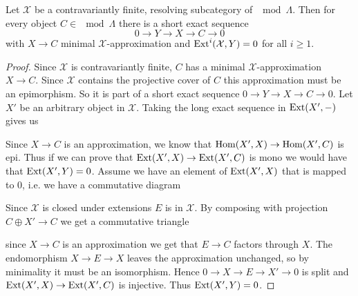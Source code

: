 \begin{lemma} \label{lem:exact_sequence_from_approximation}
	Let $\mathcal X$ be a contravariantly finite, resolving subcategory of $\mod \Lambda$. Then for every object $C \in \mod\Lambda$ there is a short exact sequence 
	$$0 \to Y \to X \to C \to 0$$ 
	with $X\to C$ minimal $\mathcal X$-approximation and $\operatorname{Ext}^i(\mathcal X, Y)=0$ for all $i \geq 1$.
	\begin{proof}
		Since $\mathcal X$ is contravariantly finite, $C$ has a minimal $\mathcal X$-approximation $X \to C$. Since $\mathcal X$ contains the projective cover of $C$ this approximation must be an epimorphism. So it is part of a short exact sequence $0 \to Y \to X \to C \to 0$. Let $X'$ be an arbitrary object in $\mathcal X$. Taking the long exact sequence in $\operatorname{Ext}(X', -)$ gives us
		\begin{center}
		\end{center}
		Since $X \to C$ is an approximation, we know that $\operatorname{Hom}(X', X) \to \operatorname{Hom}(X', C)$ is epi. Thus if we can prove that $\operatorname{Ext}(X', X) \to \operatorname{Ext}(X', C)$ is mono we would have that $\operatorname{Ext}(X', Y)=0$. Assume we have an element of $\operatorname{Ext}(X', X)$ that is mapped to 0, i.e. we have a commutative diagram
		\begin{center}
		\end{center}
		Since $\mathcal X$ is closed under extensions $E$ is in $\mathcal X$. By composing with projection $C\oplus X' \to C$ we get a commutative triangle
		\begin{center}
		\end{center}
		since $X \to C$ is an approximation we get that $E \to C$ factors through $X$. The endomorphism $X \to E \to X$ leaves the approximation unchanged, so by minimality it must be an isomorphism. Hence $0 \to X \to E \to X' \to 0$ is split and $\operatorname{Ext}(X', X) \to \operatorname{Ext}(X', C)$ is injective. Thus $\operatorname{Ext}(X', Y)=0$.
	\end{proof}
\end{lemma}


